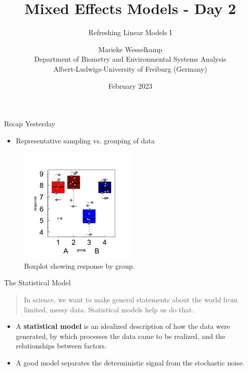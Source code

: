 \documentclass{beamer}
\title{Mixed Effects Models - Day 2}
\subtitle{Refreshing Linear Models I}
\author{Marieke Wesselkamp \\ Department of Biometry and Environmental Systems Analysis \\ Albert-Ludwigs-University of Freiburg (Germany)}
\date{February 2023}
\begin{document}
\begin{frame}
  \titlepage
\end{frame}

\begin{frame}{Recap Yesterday}
  \begin{itemize}
    \item Representative sampling vs. grouping of data
  \end{itemize}
  
  \begin{figure}[h]
    \centering
    \includegraphics[width=0.5\textwidth]{lectures/day_2_LM_refresh_I/figures/unnamed-chunk-3-1.png}
    \caption{Boxplot showing response by group.}
  \end{figure}
\end{frame}

\begin{frame}{The Statistical Model}
  \begin{quote}
    In science, we want to make general statements about the world from limited, messy data. Statistical models help us do that.
  \end{quote}
  
  \begin{itemize}
    \item A \textbf{statistical model} is an idealized description of how the data were generated, by which processes the data came to be realized, and the relationships between factors.
    \item A good model separates the deterministic signal from the stochastic noise.
  \end{itemize}
\end{frame}
\end{document}
